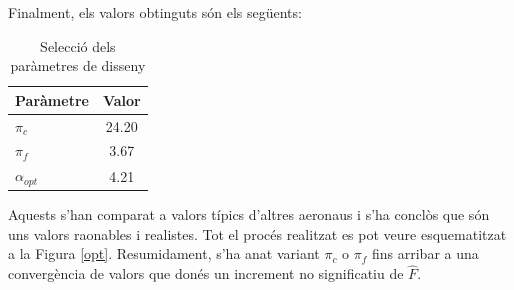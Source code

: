 Finalment, els valors obtinguts són els següents:
\begin{table}[H]
	\centering
	\begin{tabular}{lc}
		\toprule[3pt]
		\textbf{Paràmetre}&\textbf{Valor}\\
		\midrule[1pt]
		$\pi_{c}$ & 24.20 \\
		$\pi_{f}$ & 3.67 \\
		$\alpha_{opt}$ & 4.21 \\
		\bottomrule[2pt]
	\end{tabular}
	\label{C_opti2}
	\caption{Selecció dels paràmetres de disseny}
\end{table}
\noindent Aquests s'han comparat a valors típics d'altres aeronaus i s'ha conclòs que són uns valors raonables i realistes. Tot el procés realitzat es pot veure esquematitzat a la Figura \ref{opt}.
Resumidament, s'ha anat variant $\pi_c$ o $\pi_f$ fins arribar a una convergència de valors que donés un increment no significatiu de $\hat{F}$.  

